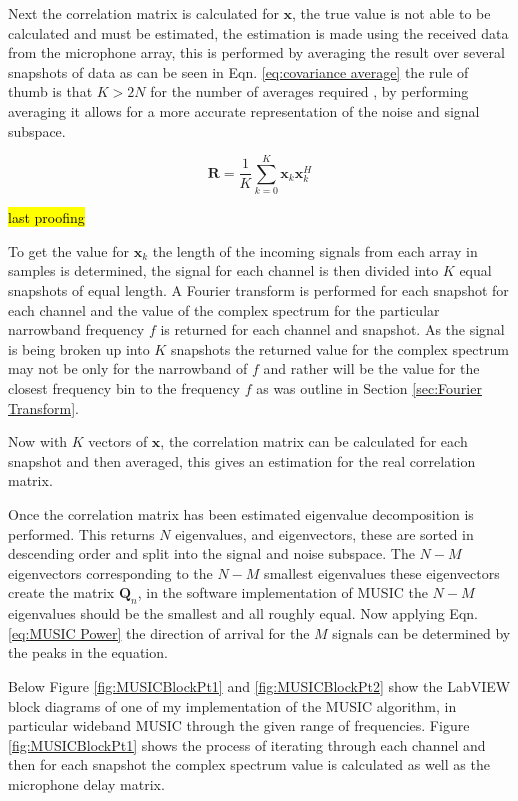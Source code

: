 \documentclass{UoNMCHA}
\numberwithin{equation}{section}
\begin{document}
    Next the correlation matrix is calculated for $\mathbf{x}$, the true value is not able to be calculated and must be estimated, the estimation is made using the received data from the microphone array, this is performed by averaging the result over several snapshots of data as can be seen in Eqn. \ref{eq:covariance average} the rule of thumb is that $K > 2N$ for the number of averages required \citep{Adv13}, by performing averaging it allows for a more accurate representation of the noise and signal subspace. 
    
    \begin{equation}
        \mathbf{R} = \frac{1}{K}\sum_{k=0}^K\mathbf{x}_k\mathbf{x}_k^H
        \label{eq:covariance average}
    \end{equation}

    \hl{last proofing}
    
    To get the value for $\mathbf{x}_k$ the length of the incoming signals from each array in samples is determined, the signal for each channel is then divided into $K$ equal snapshots of equal length. A Fourier transform is performed for each snapshot for each channel and the value of the complex spectrum for the particular narrowband frequency $f$ is returned for each channel and snapshot. As the signal is being broken up into $K$ snapshots the returned value for the complex spectrum may not be only for the narrowband of $f$ and rather will be the value for the closest frequency bin to the frequency $f$ as was outline in Section \ref{sec:Fourier Transform}.
    
    Now with $K$ vectors of $\mathbf{x}$, the correlation matrix can be calculated for each snapshot and then averaged, this gives an estimation for the real correlation matrix.
    
    Once the correlation matrix has been estimated eigenvalue decomposition is performed. This returns $N$ eigenvalues, and eigenvectors, these are sorted in descending order and split into the signal and noise subspace. The $N-M$ eigenvectors corresponding to the $N-M$ smallest eigenvalues these eigenvectors create the matrix $\mathbf{Q}_n$, in the software implementation of MUSIC the $N-M$ eigenvalues should be the smallest and all roughly equal. Now applying Eqn. \ref{eq:MUSIC Power} the direction of arrival for the $M$ signals can be determined by the peaks in the equation. 
    
    Below Figure \ref{fig:MUSICBlockPt1} and \ref{fig:MUSICBlockPt2} show the LabVIEW block diagrams of one of my implementation of the MUSIC algorithm, in particular wideband MUSIC through the given range of frequencies. Figure \ref{fig:MUSICBlockPt1} shows the process of iterating through each channel and then for each snapshot the complex spectrum value is calculated as well as the microphone delay matrix.
    
\end{document}
